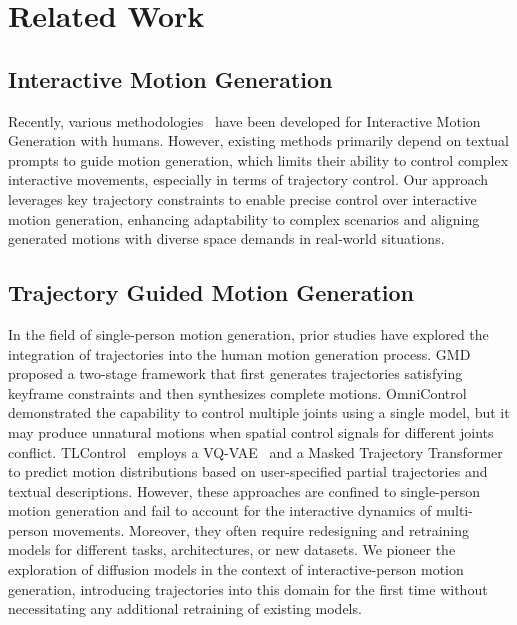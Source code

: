 \section{Related Work}
\subsection{Interactive Motion Generation}
Recently, various methodologies~\cite{liang2024intergen,zhou2023unified,wang2023intercontrol,ghosh2024remos,xu2024inter,Lee2024CVPR,shan2024towards,Li_2024_CVPR,jang2024geometry} have been developed for Interactive Motion Generation with humans.
However, existing methods primarily depend on textual prompts to guide motion generation, which limits their ability to control complex interactive movements, especially in terms of trajectory control. 
Our approach leverages key trajectory constraints to enable precise control over interactive motion generation, enhancing adaptability to complex scenarios and aligning generated motions with diverse space demands in real-world situations.
\subsection{Trajectory Guided Motion Generation}
In the field of single-person motion generation, prior studies have explored the integration of trajectories into the human motion generation process.
GMD~\cite{karunratanakul2023guided} proposed a two-stage framework that first generates trajectories satisfying keyframe constraints and then synthesizes complete motions.
OmniControl~\cite{xie2023omnicontrol} demonstrated the capability to control multiple joints using a single model, but it may produce unnatural motions when spatial control signals for different joints conflict.
TLControl~\cite{wan2023tlcontrol} employs a VQ-VAE~\cite{van2017neural} and a Masked Trajectory Transformer to predict motion distributions based on user-specified partial trajectories and textual descriptions.
However, these approaches are confined to single-person motion generation and fail to account for the interactive dynamics of multi-person movements.
Moreover, they often require redesigning and retraining models for different tasks, architectures, or new datasets.
We pioneer the exploration of diffusion models in the context of interactive-person motion generation, introducing trajectories into this domain for the first time without necessitating any additional retraining of existing models.